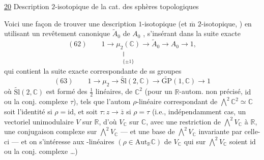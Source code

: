 \uline{20} Description $2$-isotopique de la cat. des sphères topologiques

Voici une façon de trouver une description
$1$-isotopique (et $\overline{\mathrm m}$ $2$-isotopique, )
en utilisant un  revêtement canonique
$\widetilde A_0$ de $A_0$ , s'insérant dans la suite exacte
\[
(62)\qquad
1\longrightarrow\underset{\substack{\Vert\\\{\pm1\}}}{\mu_2(\mathbb C)}
\longrightarrow\widetilde A_0\longrightarrow A_0\longrightarrow1,
\]
qui contient la  suite exacte correspondante
de ss groupes
\[
(63)\qquad
1\longrightarrow\mu_2\longrightarrow\widetilde{\mathrm{Sl}}(2,\mathbb C)
\longrightarrow\widetilde{\mathrm{GP}}(1,\mathbb C)\longrightarrow1
\]
où $\widetilde{\mathrm{Sl}}(2,\mathbb C)$ est formé des  $\frac12$ linéaires,
de $\mathbb C^2$ (pour un $\mathbb R$-autom. \inserted{$\rho$} non précisé,
$\mathrm{id}$ ou la conj. complexe $\tau$), tels que l'autom
$\rho$-linéaire correspondant de $\bigwedge^2\mathbb C^2\simeq\mathbb C$
soit l'identité si $\rho=\mathrm{id}$, et soit $\tau:z\longrightarrow\bar z$
si $\rho=\tau$ (i.e., indépendamment  cas, 
un vectoriel unimodulaire $V$ sur $\mathbb R$, d'où
$V_{\mathbb C}$ sur $\mathbb C$, avec une restriction de $\bigwedge^2 V_{\mathbb C}$ à $\mathbb R$,
 une conjugaison complexe sur $\bigwedge^2 V_{\mathbb C}$
--- et une  base de $\bigwedge^2 V_{\mathbb C}$ invariante par
celle-ci --- et on s'intéresse aux 
-linéaires $(\rho\in\mathrm{Aut}_{\mathbb R}\mathbb C)$ de $V_{\mathbb C}$ qui sur
$\bigwedge^2 V_{\mathbb C}$ soient $\mathrm{id}$ ou la conj. complexe \ldots)

